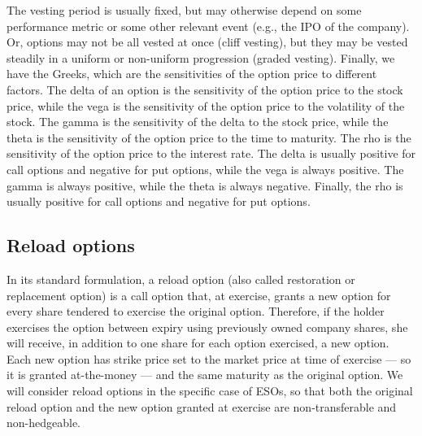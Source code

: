     

    The vesting period is usually fixed, but may otherwise depend on some performance metric or some other relevant event (e.g., the IPO of the company). Or, options may not be all vested at once (cliff vesting), but they may be vested steadily in a uniform or non-uniform progression (graded vesting).
    Finally, we have the Greeks, which are the sensitivities of the option price to different factors.
    The delta of an option is the sensitivity of the option price to the stock price, while the vega is the sensitivity of the option price to the volatility of the stock. The gamma is the sensitivity of the delta to the stock price, while the theta is the sensitivity of the option price to the time to maturity. The rho is the sensitivity of the option price to the interest rate. The delta is usually positive for call options and negative for put options, while the vega is always positive. The gamma is always positive, while the theta is always negative. Finally, the rho is usually positive for call options and negative for put options.

\subsection{Reload options} 
    In its standard formulation, a reload option (also called restoration or replacement option) is a call option that, at exercise, grants a new option for every share tendered to exercise the original option. Therefore, if the holder exercises the option between expiry using previously owned company shares, she will receive, in addition to one share for each option exercised, a new option. Each new option has strike price set to the market price at time of exercise --- so it is granted at-the-money --- and the same maturity as the original option. We will consider reload options in the specific case of ESOs, so that both the original reload option and the new option granted at exercise are non-transferable and non-hedgeable.    

